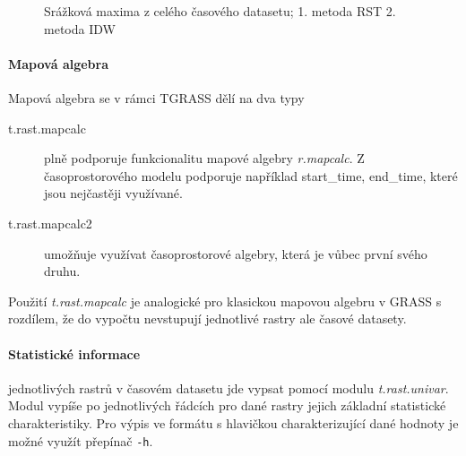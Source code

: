 \documentclass[a4paper,12pt,oneside]{report}
\begin{document}
\begin{figure}[h!]%
    \centering
    \qquad

    \caption[Serie max]{ Srážková maxima z celého časového datasetu; 1. metoda RST 2. metoda IDW  \centering }
\end{figure}




\paragraph*{Mapová algebra}
Mapová algebra se v rámci TGRASS dělí na dva typy
\begin{description}
\item [t.rast.mapcalc] plně podporuje funkcionalitu mapové algebry \textit{r.mapcalc}. Z časoprostorového modelu podporuje například start\_time, end\_time, které jsou nejčastěji využívané.
\item [t.rast.mapcalc2] umožňuje využívat časoprostorové algebry, která je vůbec první svého druhu.
\end{description}

Použití \textit{t.rast.mapcalc} je analogické pro klasickou mapovou algebru v GRASS s rozdílem, že do vypočtu nevstupují jednotlivé rastry ale časové datasety.



\paragraph{Statistické informace } jednotlivých rastrů v časovém datasetu jde vypsat pomocí modulu \textit{t.rast.univar}. Modul  vypíše po jednotlivých řádcích pro dané rastry jejich základní statistické charakteristiky. Pro výpis ve formátu s hlavičkou charakterizující dané hodnoty je možné využít přepínač \texttt{-h}.
\end{document}
